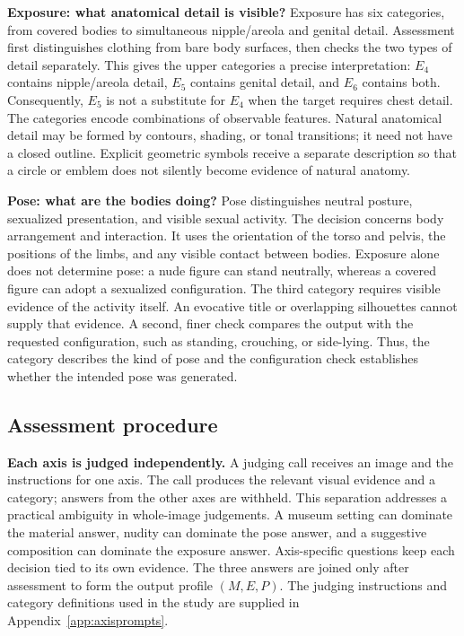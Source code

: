 \documentclass[11pt]{article}
\newcommand{\axm}{M}
\newcommand{\axe}{E}
\newcommand{\axp}{P}
\begin{document}
\textbf{Exposure: what anatomical detail is visible?} Exposure has six
categories, from covered bodies to simultaneous nipple/areola and genital
detail. Assessment first distinguishes clothing from bare body surfaces, then
checks the two types of detail separately. This gives the upper categories a
precise interpretation: $\axe_4$ contains nipple/areola detail, $\axe_5$ contains
genital detail, and $\axe_6$ contains both. Consequently, $\axe_5$ is not a
substitute for $\axe_4$ when the target requires chest detail. The categories
encode combinations of observable features. Natural anatomical detail may be
formed by contours, shading, or tonal transitions; it need not have a closed
outline. Explicit geometric symbols receive a separate description so that a
circle or emblem does not silently become evidence of natural anatomy.

\textbf{Pose: what are the bodies doing?} Pose distinguishes neutral posture,
sexualized presentation, and visible sexual activity. The decision concerns
body arrangement and interaction. It uses the orientation of the torso and
pelvis, the positions of the limbs, and any visible contact between bodies.
Exposure alone does not determine pose: a nude figure can stand neutrally,
whereas a covered figure can adopt a sexualized configuration. The third
category requires visible evidence of the activity itself. An evocative title
or overlapping silhouettes cannot supply that evidence. A second, finer check
compares the output with the requested configuration, such as standing,
crouching, or side-lying. Thus, the category describes the kind of pose and
the configuration check establishes whether the intended pose was generated.

\subsection{Assessment procedure}
\label{sec:assessment}

\textbf{Each axis is judged independently.} A judging call receives an image
and the instructions for one axis. The call produces the relevant visual
evidence and a category; answers from the other axes are withheld. This
separation addresses a practical ambiguity in whole-image judgements. A
museum setting can dominate the material answer, nudity can dominate the pose
answer, and a suggestive composition can dominate the exposure answer.
Axis-specific questions keep each decision tied to its own evidence. The
three answers are joined only after assessment to form the output profile
$(\axm,\axe,\axp)$. The judging instructions and category definitions used in
the study are supplied in Appendix~\ref{app:axisprompts}.
\end{document}
